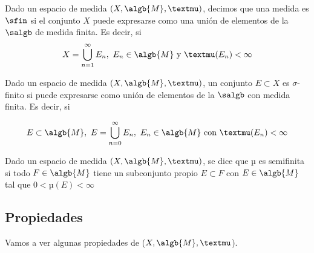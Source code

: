 \documentclass{apuntes}
\begin{document}
\begin{example}
\begin{defn}
Dado un espacio de medida $(X, \algb{M}, µ)$, decimos que una medida es $\sfin$ si el conjunto $X$ puede expresarse como una unión de elementos de la $\salgb$ de medida finita. Es decir, si \[X=\bigcup_{n=1}^{\infty}E_n, \ E_n \in \algb{M} \text{ y }µ(E_n)< \infty\]
\end{defn}

\begin{defn}
Dado un espacio de medida $(X, \algb{M}, µ)$, un conjunto $E \subset X$ es $\sigma$-finito si puede expresarse como unión de elementos de la $\salgb$ con medida finita. Es decir, si

\[E\subset \algb{M}, \ E=\bigcup_{n=0}^{\infty} E_n, \ E_n \in \algb{M} \text{ con} \ µ(E_n)< \infty\]
\end{defn}

\begin{defn}
Dado un espacio de medida $(X, \algb{M}, µ)$, se dice que µ es semifinita si todo $F\in \algb{M}$ tiene un subconjunto propio $E\subset F$ con $E\in \algb{M}$ tal que $0<µ(E) < \infty$

\end{defn}
\end{example}

\subsection{Propiedades}
Vamos a ver algunas propiedades de ($X, \algb{M}, µ$).
\end{document}

